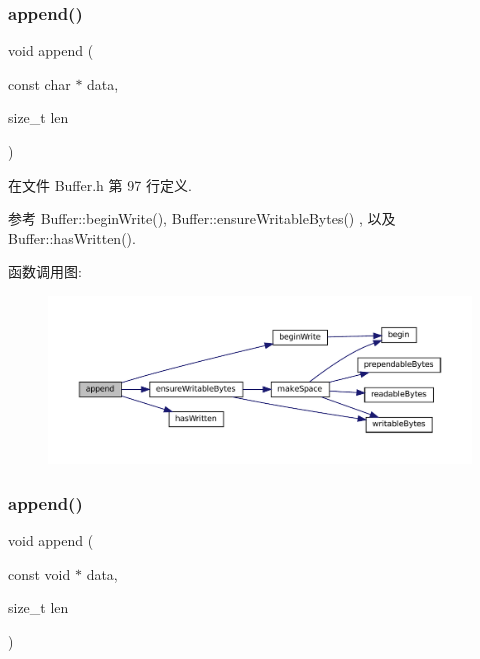 \subsubsection{\texorpdfstring{append()}{append()}\hspace{0.1cm}{\footnotesize\ttfamily [2/3]}}
{\footnotesize\ttfamily void append (\begin{DoxyParamCaption}\item[{const char $\ast$}]{data,  }\item[{size\+\_\+t}]{len }\end{DoxyParamCaption})\hspace{0.3cm}{\ttfamily [inline]}}



在文件 Buffer.\+h 第 97 行定义.



参考 Buffer\+::begin\+Write(), Buffer\+::ensure\+Writable\+Bytes() , 以及 Buffer\+::has\+Written().

函数调用图\+:
\nopagebreak
\begin{figure}[H]
\begin{center}
\leavevmode
\includegraphics[width=350pt]{classmuduo_1_1Buffer_adece1d853752b95184d19c78228a0c39_cgraph}
\end{center}
\end{figure}
\mbox{\label{classmuduo_1_1Buffer_af4c97664922a815eb9aa9dfe78686007}} 
\subsubsection{\texorpdfstring{append()}{append()}\hspace{0.1cm}{\footnotesize\ttfamily [3/3]}}
{\footnotesize\ttfamily void append (\begin{DoxyParamCaption}\item[{const void $\ast$}]{data,  }\item[{size\+\_\+t}]{len }\end{DoxyParamCaption})\hspace{0.3cm}{\ttfamily [inline]}}



